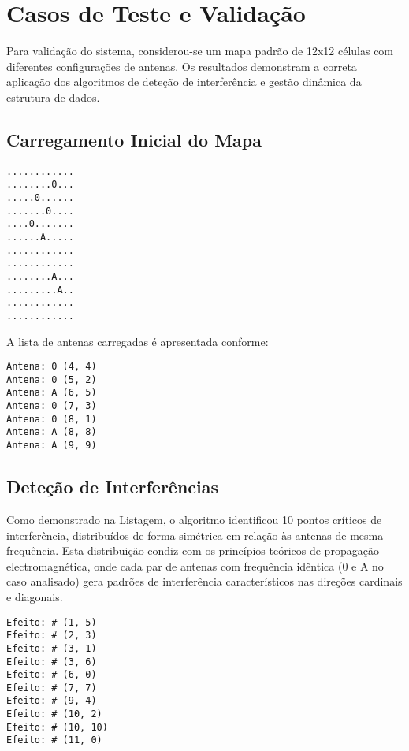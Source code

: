 \documentclass[a4paper,12pt]{report}
\begin{document}
\section{Casos de Teste e Validação}
Para validação do sistema, considerou-se um mapa padrão de 12x12 células com diferentes configurações de antenas. Os resultados demonstram a correta aplicação dos algoritmos de deteção de interferência e gestão dinâmica da estrutura de dados.

\subsection{Carregamento Inicial do Mapa}
\begin{lstlisting}[caption={Estado inicial do mapa carregado},label={lst:mapa_inicial},basicstyle=\ttfamily\small]
............
........0...
.....0......
.......0....
....0.......
......A.....
............
............
........A...
.........A..
............
............
\end{lstlisting}

A lista de antenas carregadas é apresentada conforme:

\begin{lstlisting}[caption={Antenas identificadas no mapa inicial},label={lst:antenas_inicial},basicstyle=\ttfamily\small]
Antena: 0 (4, 4)
Antena: 0 (5, 2)
Antena: A (6, 5)
Antena: 0 (7, 3)
Antena: 0 (8, 1)
Antena: A (8, 8)
Antena: A (9, 9)
\end{lstlisting}

\subsection{Deteção de Interferências}
Como demonstrado na Listagem, o algoritmo identificou 10 pontos críticos de interferência, distribuídos de forma simétrica em relação às antenas de mesma frequência. Esta distribuição condiz com os princípios teóricos de propagação electromagnética, onde cada par de antenas com frequência idêntica (0 e A no caso analisado) gera padrões de interferência característicos nas direções cardinais e diagonais.

\begin{lstlisting}[caption={Pontos de interferência detectados},label={lst:interferencias},basicstyle=\ttfamily\small]
Efeito: # (1, 5)
Efeito: # (2, 3)
Efeito: # (3, 1)
Efeito: # (3, 6)
Efeito: # (6, 0)
Efeito: # (7, 7)
Efeito: # (9, 4)
Efeito: # (10, 2)
Efeito: # (10, 10)
Efeito: # (11, 0)
\end{lstlisting}
\end{document}
